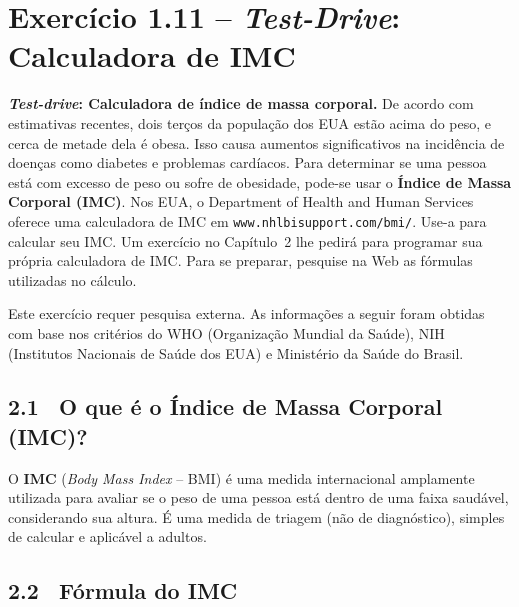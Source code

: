 \documentclass[12pt,a4paper]{article}
\begin{document}
\newpage

\section{Exercício 1.11 -- \textit{Test-Drive}: Calculadora de IMC}

\begin{enunciadoBox}[Enunciado]
\textbf{\textit{Test-drive}: Calculadora de índice de massa corporal.}
De acordo com estimativas recentes, dois terços da população dos EUA estão acima do
peso, e cerca de metade dela é obesa. Isso causa aumentos significativos na incidência
de doenças como diabetes e problemas cardíacos. Para determinar se uma pessoa está com
excesso de peso ou sofre de obesidade, pode-se usar o \textbf{Índice de Massa Corporal
(IMC)}. Nos EUA, o Department of Health and Human Services oferece uma calculadora
de IMC em \texttt{www.nhlbisupport.com/bmi/}. Use-a para calcular seu IMC. Um
exercício no Capítulo~2 lhe pedirá para programar sua própria calculadora de IMC.
Para se preparar, pesquise na Web as fórmulas utilizadas no cálculo.
\end{enunciadoBox}

\bigskip

\begin{pesquisa}
Este exercício requer pesquisa externa. As informações a seguir foram obtidas com
base nos critérios do WHO (Organização Mundial da Saúde), NIH (Institutos Nacionais
de Saúde dos EUA) e Ministério da Saúde do Brasil.
\end{pesquisa}

\bigskip

\subsection*{2.1 \ O que é o Índice de Massa Corporal (IMC)?}

O \textbf{IMC} (\textit{Body Mass Index} -- BMI) é uma medida internacional
amplamente utilizada para avaliar se o peso de uma pessoa está dentro de uma
faixa saudável, considerando sua altura. É uma medida de triagem (não de diagnóstico),
simples de calcular e aplicável a adultos.

\bigskip

\subsection*{2.2 \ Fórmula do IMC}
\end{document}
